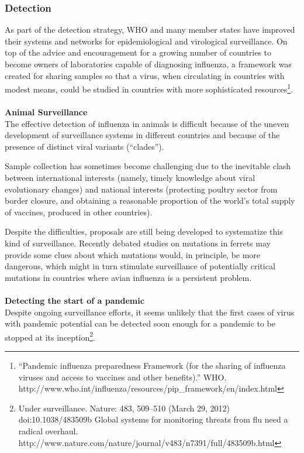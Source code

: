 \documentclass[12pt, a4]{scrartcl}
\begin{document}
\subsubsection{Detection}
As part of the detection strategy, WHO and many member states have improved their systems and networks for epidemiological and virological surveillance. On top of the advice and encouragement for a growing number of countries to become owners of laboratories capable of diagnosing influenza, a framework was created for sharing samples so that a virus, when circulating in countries with modest means, could be studied in countries with more sophisticated resources\footnote{“Pandemic influenza preparedness Framework (for the sharing of influenza viruses and access to vaccines and other benefits).” WHO. http://www.who.int/influenza/resources/pip_framework/en/index.html}.
\\
\\
\textbf{Animal Surveillance}\\
The effective detection of influenza in animals is difficult because of the uneven development of surveillance systems in different countries and because of the presence of distinct viral variants (“clades”).

Sample collection has sometimes become challenging due to the inevitable clash between international interests (namely, timely knowledge about viral evolutionary changes) and national interests (protecting poultry sector from border closure, and obtaining a reasonable proportion of the world’s total supply of vaccines, produced in other countries).

Despite the difficulties, proposals are still being developed to systematize this kind of surveillance. Recently debated studies on mutations in ferrets may provide some clues about which mutations would, in principle, be more dangerous, which might in turn stimulate surveillance of potentially critical mutations in countries where avian influenza is a persistent problem.
\\
\\
\textbf{Detecting the start of a pandemic}\\
Despite ongoing surveillance efforts, it seems unlikely that the first cases of virus with pandemic potential can be detected soon enough for a pandemic to be stopped at its inception\footnote{Under surveillance. Nature: 483, 509–510 (March 29, 2012) doi:10.1038/483509b Global systems for monitoring threats from flu need a radical overhaul. http://www.nature.com/nature/journal/v483/n7391/full/483509b.html}.
\end{document}
